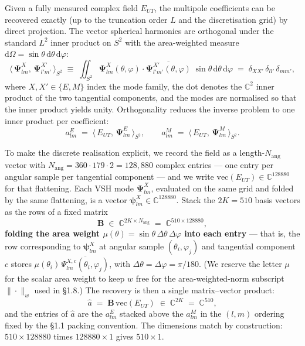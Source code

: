 \documentclass[11pt,a4paper]{report}
\begin{document}
Given a fully measured complex field $E_{UT}$, the multipole coefficients can be
recovered exactly (up to the truncation order $L$ and the discretisation grid) by
direct projection. The vector spherical harmonics are orthogonal under the standard
$L^2$ inner product on $S^2$ with the area-weighted measure
$\mathrm{d}\Omega = \sin\theta\,\mathrm{d}\theta\,\mathrm{d}\varphi$:
\[
\langle\,\boldsymbol{\Psi}^X_{lm},\, \boldsymbol{\Psi}^{X'}_{l'm'}\,\rangle_{S^2}
\;\equiv\;\iint_{S^2} \boldsymbol{\Psi}^X_{lm}(\theta,\varphi) \cdot \overline{\boldsymbol{\Psi}^{X'}_{l'm'}(\theta,\varphi)}\;\sin\theta\,\mathrm{d}\theta\,\mathrm{d}\varphi
\;=\;\delta_{XX'}\,\delta_{ll'}\,\delta_{mm'},
\]
where $X, X' \in \{E, M\}$ index the mode family, the dot denotes the $\mathbb{C}^2$
inner product of the two tangential components, and the modes are normalised so that
the inner product yields unity. Orthogonality reduces the inverse problem to one
inner product per coefficient:
\[
a^E_{lm} \;=\; \langle\,E_{UT},\, \boldsymbol{\Psi}^E_{lm}\,\rangle_{S^2}, \qquad
a^M_{lm} \;=\; \langle\,E_{UT},\, \boldsymbol{\Psi}^M_{lm}\,\rangle_{S^2}.
\]

To make the discrete realisation explicit, we record the field as a length-$N_{\mathrm{ang}}$
vector with $N_{\mathrm{ang}} = 360\cdot 179\cdot 2 = 128{,}880$ complex entries
--- one entry per angular sample per tangential component --- and we write
$\mathrm{vec}(E_{UT})\in\mathbb{C}^{128880}$ for that flattening. Each VSH mode
$\boldsymbol{\Psi}^X_{lm}$, evaluated on the same grid and folded by the same
flattening, is a vector $\boldsymbol\psi^X_{lm}\in\mathbb{C}^{128880}$. Stack the
$2K = 510$ basis vectors as the rows of a fixed matrix
\[
\mathbf{B} \;\in\; \mathbb{C}^{2K \times N_{\mathrm{ang}}} \;=\; \mathbb{C}^{510 \times 128880},
\]
\textbf{folding the area weight $\mu(\theta) = \sin\theta\,\Delta\theta\,\Delta\varphi$
into each entry} --- that is, the row corresponding to $\boldsymbol\psi^X_{lm}$ at
angular sample $(\theta_i, \varphi_j)$ and tangential component $c$ stores
$\mu(\theta_i)\,\overline{\Psi^{X,c}_{lm}(\theta_i,\varphi_j)}$, with
$\Delta\theta = \Delta\varphi = \pi/180$. (We reserve the letter $\mu$ for the scalar
area weight to keep $w$ free for the area-weighted-norm subscript $\|\cdot\|_w$ used
in \S1.8.) The recovery is then a single matrix--vector product:
\[
\hat{a} \;=\; \mathbf{B}\,\mathrm{vec}(E_{UT}) \;\in\; \mathbb{C}^{2K} \;=\; \mathbb{C}^{510},
\]
and the entries of $\hat a$ are the $a^E_{lm}$ stacked above the $a^M_{lm}$ in the
$(l,m)$ ordering fixed by the \S1.1 packing convention. The dimensions match by
construction: $510 \times 128880$ times $128880 \times 1$ gives $510 \times 1$.
\end{document}
